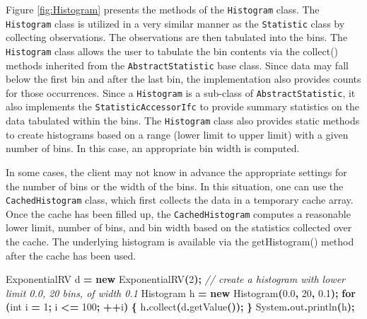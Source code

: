 \documentclass[
]{book}
\newenvironment{Shaded}{\begin{snugshade}}{\end{snugshade}}
\newcommand{\BuiltInTok}[1]{#1}
\newcommand{\CommentTok}[1]{\textcolor[rgb]{0.56,0.35,0.01}{\textit{#1}}}
\newcommand{\ControlFlowTok}[1]{\textcolor[rgb]{0.13,0.29,0.53}{\textbf{#1}}}
\newcommand{\DataTypeTok}[1]{\textcolor[rgb]{0.13,0.29,0.53}{#1}}
\newcommand{\DecValTok}[1]{\textcolor[rgb]{0.00,0.00,0.81}{#1}}
\newcommand{\FloatTok}[1]{\textcolor[rgb]{0.00,0.00,0.81}{#1}}
\newcommand{\FunctionTok}[1]{\textcolor[rgb]{0.00,0.00,0.00}{#1}}
\newcommand{\KeywordTok}[1]{\textcolor[rgb]{0.13,0.29,0.53}{\textbf{#1}}}
\newcommand{\NormalTok}[1]{#1}
\newcommand{\OperatorTok}[1]{\textcolor[rgb]{0.81,0.36,0.00}{\textbf{#1}}}
\theoremstyle{definition}
\theoremstyle{definition}
\theoremstyle{definition}
\theoremstyle{definition}
\theoremstyle{remark}
\begin{document}
Figure \ref{fig:Histogram} presents the methods of the \texttt{Histogram} class. The \texttt{Histogram} class is utilized in a very similar manner as the \texttt{Statistic} class by collecting observations. The observations are then tabulated into the bins. The \texttt{Histogram} class allows the user to tabulate the bin contents via the collect() methods inherited from the \texttt{AbstractStatistic} base class. Since data may fall below the first bin and after the last bin, the implementation also provides counts for those occurrences. Since a \texttt{Histogram} is a sub-class of \texttt{AbstractStatistic}, it also implements the \texttt{StatisticAccessorIfc} to provide summary statistics on the data tabulated within the bins. The \texttt{Histogram} class also provides static methods to create histograms based on a range (lower limit to upper limit) with a given number of bins. In this case, an appropriate bin width is computed.

In some cases, the client may not know in advance the appropriate settings for the number of bins or the width of the bins. In this situation, one can use the \texttt{CachedHistogram} class, which first collects the data in a temporary cache array. Once the cache has been filled up, the \texttt{CachedHistogram} computes a reasonable lower limit, number of bins, and bin width based on the statistics collected over the cache. The underlying histogram is available via the getHistogram() method after the cache has been used.

\begin{Shaded}
\begin{Highlighting}[]
\NormalTok{ExponentialRV d }\OperatorTok{=} \KeywordTok{new} \FunctionTok{ExponentialRV}\OperatorTok{(}\DecValTok{2}\OperatorTok{);}
\CommentTok{// create a histogram with lower limit 0.0, 20 bins, of width 0.1}
\NormalTok{Histogram h }\OperatorTok{=} \KeywordTok{new} \FunctionTok{Histogram}\OperatorTok{(}\FloatTok{0.0}\OperatorTok{,} \DecValTok{20}\OperatorTok{,} \FloatTok{0.1}\OperatorTok{);}
\ControlFlowTok{for} \OperatorTok{(}\DataTypeTok{int}\NormalTok{ i }\OperatorTok{=} \DecValTok{1}\OperatorTok{;}\NormalTok{ i }\OperatorTok{\textless{}=} \DecValTok{100}\OperatorTok{;} \OperatorTok{++}\NormalTok{i}\OperatorTok{)} \OperatorTok{\{}
\NormalTok{    h}\OperatorTok{.}\FunctionTok{collect}\OperatorTok{(}\NormalTok{d}\OperatorTok{.}\FunctionTok{getValue}\OperatorTok{());}
\OperatorTok{\}}
\BuiltInTok{System}\OperatorTok{.}\FunctionTok{out}\OperatorTok{.}\FunctionTok{println}\OperatorTok{(}\NormalTok{h}\OperatorTok{);}
\end{Highlighting}
\end{Shaded}
\end{document}
